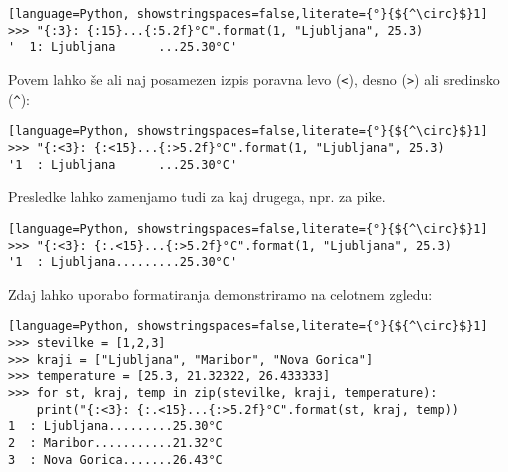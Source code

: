 \begin{lstlisting}[language=Python, showstringspaces=false,literate={°}{${^\circ}$}1]
>>> "{:3}: {:15}...{:5.2f}°C".format(1, "Ljubljana", 25.3)
'  1: Ljubljana      ...25.30°C'
\end{lstlisting}
Povem lahko še ali naj posamezen izpis poravna levo (\texttt{<}), desno (\texttt{>}) ali sredinsko (\texttt{\^}):
\begin{lstlisting}[language=Python, showstringspaces=false,literate={°}{${^\circ}$}1]
>>> "{:<3}: {:<15}...{:>5.2f}°C".format(1, "Ljubljana", 25.3)
'1  : Ljubljana      ...25.30°C'
\end{lstlisting}
Presledke lahko zamenjamo tudi za kaj drugega, npr. za pike.
\begin{lstlisting}[language=Python, showstringspaces=false,literate={°}{${^\circ}$}1]
>>> "{:<3}: {:.<15}...{:>5.2f}°C".format(1, "Ljubljana", 25.3)
'1  : Ljubljana.........25.30°C'
\end{lstlisting}
Zdaj lahko uporabo formatiranja demonstriramo na celotnem zgledu:
\begin{lstlisting}[language=Python, showstringspaces=false,literate={°}{${^\circ}$}1]
>>> stevilke = [1,2,3]
>>> kraji = ["Ljubljana", "Maribor", "Nova Gorica"]
>>> temperature = [25.3, 21.32322, 26.433333]
>>> for st, kraj, temp in zip(stevilke, kraji, temperature):
	print("{:<3}: {:.<15}...{:>5.2f}°C".format(st, kraj, temp))
1  : Ljubljana.........25.30°C
2  : Maribor...........21.32°C
3  : Nova Gorica.......26.43°C
\end{lstlisting}


